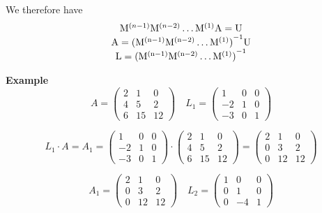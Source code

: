  We therefore have
 $$
     \begin{matrix}
        \mathrm{M}^{(n-1)}\mathrm{M}^{(n-2)}\hdots\mathrm{M}^{(1)}\mathrm{A} = \mathrm{U}\\
        \mathrm{A} = \mathrm{(\mathrm{M}^{(n-1)}\mathrm{M}^{(n-2)}\hdots\mathrm{M}^{(1)})}^{-1}\mathrm{U}\\         \mathrm{L} = \mathrm{(\mathrm{M}^{(n-1)}\mathrm{M}^{(n-2)}\hdots\mathrm{M}^{(1)})}^{-1}
     \end{matrix}
 $$
 
\textbf{Example}
$$
A = 
\begin{pmatrix}
2 & 1 & 0\\
4 & 5 & 2\\
6 & 15 & 12
\end{pmatrix}
\quad
L_1 = 
\begin{pmatrix}
1 & 0 & 0\\
-2 & 1 & 0\\
-3 & 0 & 1
\end{pmatrix}
$$

$$
L_1 \cdot A = A_1 = \begin{pmatrix}
1 & 0 & 0\\
-2 & 1 & 0\\
-3 & 0 & 1
\end{pmatrix} \cdot
\begin{pmatrix}
2 & 1 & 0\\
4 & 5 & 2\\
6 & 15 & 12
\end{pmatrix} = 
\begin{pmatrix}
2 & 1 & 0\\
0 & 3 & 2\\
0 & 12 & 12
\end{pmatrix}
$$

$$
A_1 = 
\begin{pmatrix}
2 & 1 & 0\\
0 & 3 & 2\\
0 & 12 & 12
\end{pmatrix}
\quad
L_2 = 
\begin{pmatrix}
1 & 0 & 0\\
0 & 1 & 0\\
0 & -4 & 1
\end{pmatrix}
$$

